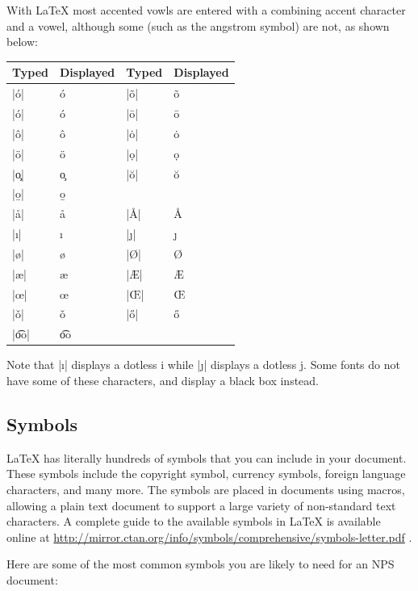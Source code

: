 With \LaTeX{} most accented vowls are entered with a combining accent character
and a vowel, although some (such as the angstrom symbol) are not, as shown
below:

\begin{center}
\begin{tabular}{l|l||l|l}
Typed    & Displayed & Typed   & Displayed\\\hline
|\'{o}|  & \'{o}     & |\~{o}| & \~{o} \\
|\'{o}|  & \'{o}     & |\={o}| & \={o} \\
|\^{o}|  & \^{o}     & |\.{o}| & \.{o} \\
|\"{o}|  & \"{o}     & |\d{o}| & \d{o} \\
|\c{o}|  & \c{o}     & |\u{o}| & \u{o} \\
|\b{o}|  & \b{o} \\
|\aa|    & \aa       & |\AA|   & \AA \\
|\i|     & \i        & |\j|    & \j \\
|\o|     & \o        & |\O|    & \O \\
|\ae|    & \ae       & |\AE|   & \AE \\
|\oe|    & \oe       & |\OE|   & \OE \\
|\v{o}|  & \v{o}     & |\H{o}| & \H{o} \\
|\t{oo}| & \t{oo} \\
\end{tabular}
\end{center}

Note that |\i| displays a dotless i while |\j| displays a dotless j. Some fonts
do not have some of these characters, and display a black box instead.

\subsection{Symbols}

\LaTeX{} has literally hundreds of symbols that you can include in your
document. These symbols  include the copyright symbol, currency symbols,
foreign language characters, and many more.  The symbols are placed in
documents using macros, allowing a plain text document to support a large
variety of non-standard text characters.  A complete guide to the available
symbols in \LaTeX{} is available online at
\url{http://mirror.ctan.org/info/symbols/comprehensive/symbols-letter.pdf} .

Here are some of the most common symbols you are likely to need for an
NPS document:

